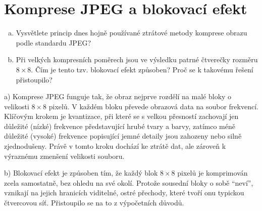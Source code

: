 \section{Komprese JPEG a blokovací efekt}
\begin{enumerate}[a)]
    \item Vysvětlete princip dnes hojně používané ztrátové metody komprese obrazu podle standardu JPEG? 
    \item Při velkých kompresních poměrech jsou ve výsledku patrné čtverečky rozměru $8 \times 8$. Čím je tento tzv. 
    blokovací efekt způsoben? Proč se k takovému řešení přistoupilo?
\end{enumerate}
a) Komprese JPEG funguje tak, že obraz nejprve rozdělí na malé bloky o velikosti $8 \times 8$ pixelů. V každém bloku 
převede obrazová data na soubor frekvencí. Klíčovým krokem je kvantizace, při které se s velkou přesností zachovají jen 
důležité (nízké) frekvence představující hrubé tvary a barvy, zatímco méně důležité (vysoké) frekvence popisující jemné 
detaily jsou zahozeny nebo silně zjednodušeny. Právě v tomto kroku dochází ke ztrátě dat, ale zároveň k výraznému 
zmenšení velikosti souboru.

b) Blokovací efekt je způsoben tím, že každý blok $8 \times 8$ pixelů je komprimován zcela samostatně, bez ohledu na své 
okolí. Protože sousední bloky o sobě \enquote{neví}, vznikají na jejich hranicích viditelné, ostré přechody, které tvoří 
onu typickou čtvercovou síť. Přistoupilo se na to z výpočetních důvodů.